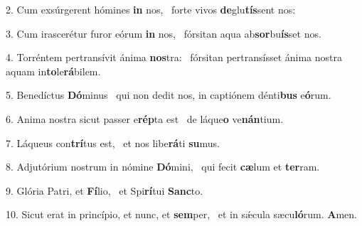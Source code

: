 2. Cum exsúrgerent hómines \textbf{in} nos, \ast\  forte vivos \textbf{de}glu\textbf{tís}sent nos:\

3. Cum irascerétur furor eórum \textbf{in} nos, \ast\  fórsitan aqua ab\textbf{sor}bu\textbf{ís}set nos.\

4. Torréntem pertransívit ánima \textbf{nos}tra: \ast\  fórsitan pertransísset ánima nostra aquam in\textbf{to}le\textbf{rá}bilem.\

5. Benedíctus \textbf{Dó}minus \ast\  qui non dedit nos, in captiónem dénti\textbf{bus} e\textbf{ó}rum.\

6. Anima nostra sicut passer e\textbf{rép}ta est \ast\  de láque\textbf{o} ve\textbf{nán}tium.\

7. Láqueus con\textbf{trí}tus est, \ast\  et nos libe\textbf{rá}ti \textbf{su}mus.\

8. Adjutórium nostrum in nómine \textbf{Dó}mini, \ast\  qui fecit \textbf{cæ}lum et \textbf{ter}ram.\

9. Glória Patri, et \textbf{Fí}lio, \ast\  et Spi\textbf{rí}tui \textbf{Sanc}to.\

10. Sicut erat in princípio, et nunc, et \textbf{sem}per, \ast\  et in sǽcula sæcu\textbf{ló}rum. \textbf{A}men.\


